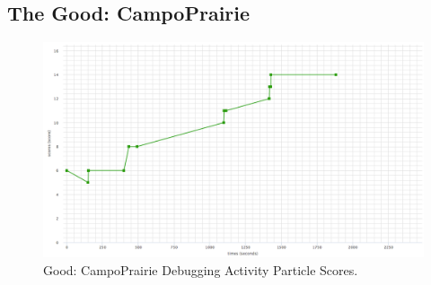\subsection{The Good: CampoPrairie}
\begin{figure}
	\centering
	\includegraphics[width=\textwidth]{images/stories/scores-debug-CampoPrairie}
	\caption[Good: CampoPrairie Debugging Activity Particle Scores]{Good: CampoPrairie Debugging Activity Particle Scores.}
	\label{fig:CampoPrairie_chart}
\end{figure}

